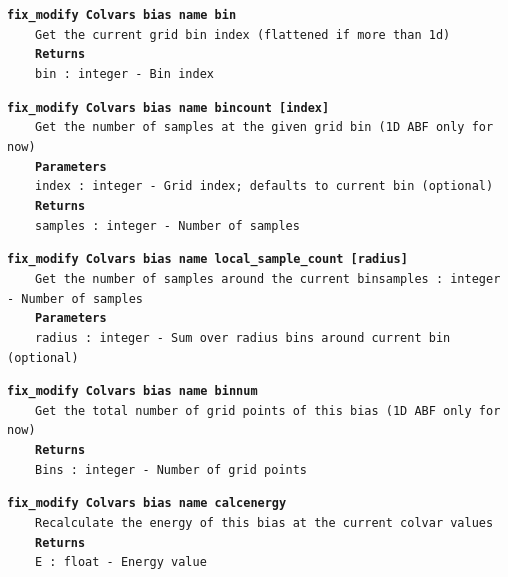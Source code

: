 \begin{mdexampleinput}{}
\texttt{\textbf{fix\_modify Colvars bias name bin}}
\\
\-~~~~\texttt{Get the current grid bin index (flattened if more than 1d)}
\\
\-~~~~\texttt{\textbf{Returns}}
\\
\-~~~~\texttt{bin : integer - Bin index}
\end{mdexampleinput}
\begin{mdexampleinput}{}
\texttt{\textbf{fix\_modify Colvars bias name bincount [index]}}
\\
\-~~~~\texttt{Get the number of samples at the given grid bin (1D ABF only for now)}
\\
\-~~~~\texttt{\textbf{Parameters}}
\\
\-~~~~\texttt{index : integer - Grid index; defaults to current bin (optional)}
\\
\-~~~~\texttt{\textbf{Returns}}
\\
\-~~~~\texttt{samples : integer - Number of samples}
\end{mdexampleinput}
\begin{mdexampleinput}{}
\texttt{\textbf{fix\_modify Colvars bias name local\_sample\_count [radius]}}
\\
\-~~~~\texttt{Get the number of samples around the current binsamples : integer - Number of samples}
\\
\-~~~~\texttt{\textbf{Parameters}}
\\
\-~~~~\texttt{radius : integer - Sum over radius bins around current bin (optional)}
\end{mdexampleinput}
\begin{mdexampleinput}{}
\texttt{\textbf{fix\_modify Colvars bias name binnum}}
\\
\-~~~~\texttt{Get the total number of grid points of this bias (1D ABF only for now)}
\\
\-~~~~\texttt{\textbf{Returns}}
\\
\-~~~~\texttt{Bins : integer - Number of grid points}
\end{mdexampleinput}
\begin{mdexampleinput}{}
\texttt{\textbf{fix\_modify Colvars bias name calcenergy}}
\\
\-~~~~\texttt{Recalculate the energy of this bias at the current colvar values}
\\
\-~~~~\texttt{\textbf{Returns}}
\\
\-~~~~\texttt{E : float - Energy value}
\end{mdexampleinput}
